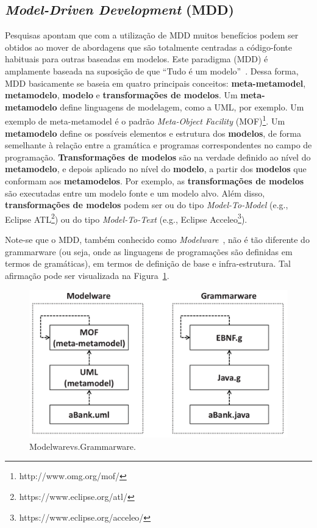\subsection{\textit{Model-Driven Development} (MDD)}\label{sec:model_driven_development}

Pesquisas apontam que com a utilização de MDD muitos benefícios podem ser obtidos ao mover de abordagens que são totalmente centradas a código-fonte habituais para outras baseadas em modelos. Este paradigma (MDD) é amplamente baseada na suposição de que ``Tudo é um modelo''~\citep{On_the_unification_power_of_models}. Dessa forma, MDD basicamente se baseia em quatro principais conceitos: \textbf{meta-metamodel}, \textbf{metamodelo}, \textbf{modelo} e \textbf{transformações de modelos}. Um \textbf{meta-metamodelo} define linguagens de modelagem, como a UML, por exemplo. Um exemplo de meta-metamodel é o padrão \textit{Meta-Object Facility} (MOF)\footnote{http://www.omg.org/mof/}. Um \textbf{metamodelo} define os possíveis elementos e estrutura dos \textbf{modelos}, de forma semelhante à relação entre a gramática e programas correspondentes no campo de programação. \textbf{Transformações de modelos} são na verdade definido ao nível do \textbf{metamodelo}, e depois aplicado no nível do \textbf{modelo}, a partir dos \textbf{modelos} que conformam aos \textbf{metamodelos}. Por exemplo, as \textbf{transformações de modelos} são executadas entre um modelo fonte e um modelo alvo. Além disso, \textbf{transformações de modelos} podem ser ou do tipo \textit{Model-To-Model} (e.g., Eclipse ATL\footnote{https://www.eclipse.org/atl/}) ou do tipo \textit{Model-To-Text} (e.g., Eclipse Acceleo\footnote{https://www.eclipse.org/acceleo/}).

Note-se que o MDD, também conhecido como \textit{Modelware}~\citep{OMGMDD}, não é tão diferente do grammarware (ou seja, onde as linguagens de programações são definidas em termos de gramáticas), em termos de definição de base e infra-estrutura. Tal afirmação pode ser visualizada na Figura~\ref{fig:modelWareVsGrammarWare}. 

\begin{figure}[!ht]
\centering
  \includegraphics[scale=0.25]{figuras/modelWareVSGrammarWare}
\caption{Modelwarevs.Grammarware.}
\label{fig:modelWareVsGrammarWare}
\end{figure}

